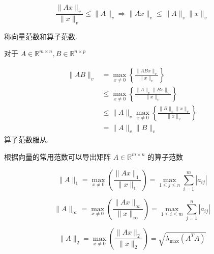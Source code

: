 \begin{definition}[向量范数和算子范数相容]
    \begin{equation} \frac{\|A x\|_{v}}{\|x\|_{v}} \leq\|A\|_{v} \Rightarrow\|A x\|_{v} \leq\|A\|_{v}\|x\|_{v} \end{equation}

    称向量范数和算子范数. 
\end{definition}

\begin{theorem}[算子范数服从乘法范数相容性]
   对于 $ A \in \mathbb{R}^{m \times n}, B \in \mathbb{R}^{n \times p} $

    \begin{equation}\begin{aligned}
        \|A B\|_{v} &=\max _{x \neq 0}\left\{\frac{\|A B x\|_{v}}{\|x\|_{v}}\right\} \\
        & \leq \max _{x \neq 0}\left\{\frac{\|A\|_{v}\|B x\|_{v}}{\|x\|_{v}}\right\} \\
        & \leq\|A\|_{v} \max _{x \neq 0}\left\{\frac{\|B\|_{v}\|x\|_{v}}{\|x\|_{v}}\right\} \\
        & =\|A\|_{v}\|B\|_{v}
    \end{aligned}\end{equation}
    算子范数服从.
\end{theorem}

根据向量的常用范数可以导出矩阵 $ A \in \mathbb{R}^{m \times n} $ 的算子范数

\begin{definition}[$A$的列范数]
    \begin{equation} \|A\|_{1}=\max _{x \neq 0}\left(\frac{\|A x\|_{1}}{\|x\|_{1}}\right)=\max _{1 \leq j \leq n} \sum_{i=1}^{m}\left|a_{i j}\right| \end{equation}
\end{definition}

\begin{definition}[$A$的行范数]
    \begin{equation} \|A\|_{\infty}=\max _{x \neq 0}\left( \frac{\|A x\|_{\infty}}{\|x\|_{\infty}}    \right)=\max _{1 \leq i \leq m} \sum_{j=1}^{n}\left|a_{i j}\right| \end{equation}
\end{definition}

\begin{definition}[$A$的2-范数]
    \begin{equation}
        \label{eqn:a-l2-norm}
        \|A\|_{2}=\max _{x \neq 0}\left( \frac{\|A x\|_{2}}{\|x\|_{2}}  \right)=\sqrt{\lambda_{\max }\left(A^{T} A\right)}
    \end{equation}
    \begin{equation}  \end{equation}
\end{definition}

